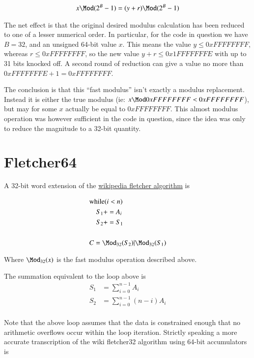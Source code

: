 \documentclass{article}
\begin{document}
\begin{align*}
x \Mod (2^B -1) &= (y + r) \Mod (2^B -1) \\
\end{align*}

The net effect is that the original desired modulus calculation has been reduced to one of a lesser numerical order.  In particular, for the
code in question we have $B=32$, and an unsigned 64-bit value $x$.  This means the value $y \le 0xFFFFFFFF$, whereas $r \le 0xFFFFFFFF$, so the new value
$y + r \le 0x1FFFFFFFE$ with up to 31 bits knocked off.  A second round of reduction can give a value no more than $0xFFFFFFFE + 1 = 0xFFFFFFFF$.

The conclusion is that this ``fast modulus'' isn't exactly a modulus replacement.  Instead it is either the true modulus (ie: $x \Mod 0xFFFFFFFF < 0xFFFFFFFF$), but may for some $x$ actually be equal to $0xFFFFFFFF$.  This almost modulus operation was however sufficient in the code in question, since the idea was only to reduce the magnitude to a 32-bit quantity.

\section{Fletcher64 }

A 32-bit word extension of the \href{http://en.wikipedia.org/wiki/Fletcher%27s_checksum}{wikipedia fletcher algorithm} is

\begin{align*}
&\text{while} ( i < n )  \\
&\quad   S_1 += A_i \\
&\quad   S_2 += S_1 \\
\\
&C = \Mod_{32}(S_2) | \Mod_{32}(S_1)
\end{align*}

Where $\Mod_{32}(x)$ is the fast modulus operation described above.

The summation equivalent to the loop above is
\begin{align*}
S_1 &= \sum_{i=0}^{n-1} A_i \\
S_2 &= \sum_{i=0}^{n-1} (n-i)A_i \\
\end{align*}

Note that the above loop assumes that the data is constrained enough that no arithmetic overflows occur within the loop iteration.
Strictly speaking a more accurate transcription of the wiki fletcher32 algorithm using 64-bit accumulators is
\end{document}
